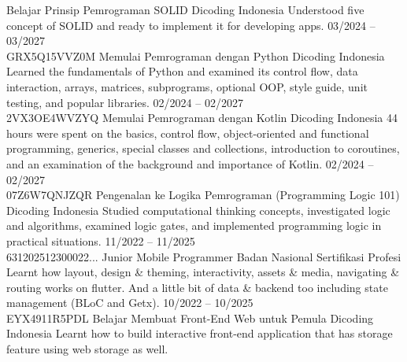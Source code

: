 \documentclass[9pt]{developercv} %
\begin{document}
\begin{entrylist}
	{Belajar Prinsip Pemrograman SOLID}
	{Dicoding Indonesia}
	{Understood five concept of SOLID and ready to implement it for developing apps.}
	\entry
	{03/2024 -- 03/2027
		\\\footnotesize{GRX5Q15VVZ0M}}
	{Memulai Pemrograman dengan Python}
	{Dicoding Indonesia}
	{Learned the fundamentals of Python and examined its control flow, data interaction, arrays, matrices, subprograms, optional OOP, style guide, unit testing, and popular libraries.}
	\entry
	{02/2024 -- 02/2027
		\\\footnotesize{2VX3OE4WVZYQ}}
	{Memulai Pemrograman dengan Kotlin}
	{Dicoding Indonesia}
	{44 hours were spent on the basics, control flow, object-oriented and functional programming, generics, special classes and collections, introduction to coroutines, and an examination of the background and importance of Kotlin.}
	\entry
	{02/2024 -- 02/2027
		\\\footnotesize{07Z6W7QNJZQR}}
	{Pengenalan ke Logika Pemrograman (Programming Logic 101)}
	{Dicoding Indonesia}
	{Studied computational thinking concepts, investigated logic and algorithms, examined logic gates, and implemented programming logic in practical situations.}
	\entry
	{11/2022 -- 11/2025
		\\\footnotesize{631202512300022...}}
	{Junior Mobile Programmer}
	{Badan Nasional Sertifikasi Profesi}
	{Learnt how layout, design \& theming, interactivity, assets \& media, navigating \& routing works on flutter. And a little bit of data \& backend too including state management (BLoC and Getx).}
	\entry
	{10/2022 -- 10/2025
		\\\footnotesize{EYX4911R5PDL}}
	{Belajar Membuat Front-End Web untuk Pemula}
	{Dicoding Indonesia}
	{Learnt how to build interactive front-end application that has storage feature using web storage as well.}
\end{entrylist}
\end{document}
